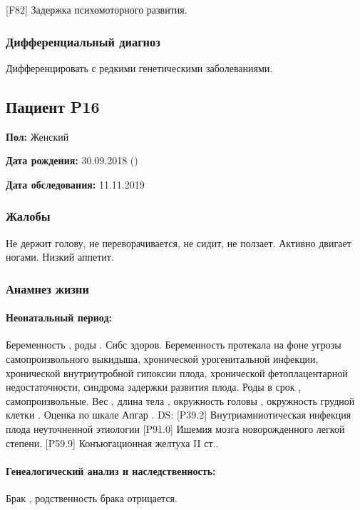\documentclass[a4paper,14pt]{extarticle}
\newcommand{\gramm}{г}
\newcommand{\cm}{см}
\newcommand{\weeks}{нед.}
\newcommand{\DS}[2]{[#2] #1}
\begin{document}
\DS{Задержка психомоторного развития}{F82}.

\subsubsection*{Дифференциальный диагноз}

Дифференцировать с редкими генетическими заболеваниями.

\newpage
\subsection*{Пациент P16}

\textbf{Пол:} Женский

\textbf{Дата рождения:} 30.09.2018 ()

\textbf{Дата обследования:} 11.11.2019

\subsubsection*{Жалобы}

Не держит голову, не переворачивается, не сидит, не ползает. Активно двигает ногами. Низкий аппетит.

\subsubsection*{Анамнез жизни}

\paragraph{Неонатальный период:} Беременность , роды . Сибс здоров. Беременность протекала на фоне угрозы самопроизвольного выкидыша, хронической урогенитальной инфекции, хронической внутриутробной гипоксии плода, хронической фетоплацентарной недостаточности, синдрома задержки развития плода. Роды в срок \numprint[\weeks]{39}, самопроизвольные. Вес \numprint[\gramm]{2860}, длина тела \numprint[\cm]{49}, окружность головы \numprint[\cm]{33}, окружность грудной клетки \numprint[\cm]{30}. Оценка по шкале Апгар . DS: \DS{Внутриамниотическая инфекция плода неуточненной этиологии}{P39.2} \DS{Ишемия мозга новорожденного легкой степени}{P91.0}. \DS{Конъюгационная желтуха II ст.}{P59.9}.

\paragraph{Генеалогический анализ и наследственность:} Брак , родственность брака отрицается.
\end{document}
